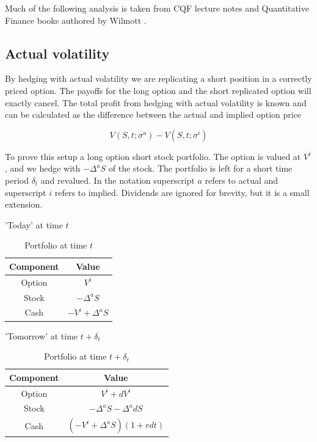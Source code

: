 \documentclass{article}
\newcommand{\para}{\vspace{8pt}} %
\begin{document}
\para
Much of the following analysis is taken from CQF lecture notes and Quantitative Finance books authored by Wilmott \cite{wilmott}.

\subsection{Actual volatility}

By hedging with actual volatility we are replicating a short position in a correctly priced option. The payoffs for the long option and the short replicated option will
exactly cancel.  The total profit from hedging with actual volatility is known and can be calculated as the difference between the actual and implied option price

\[
V(S, t; \sigma^a) - V(S, t; \sigma^i)
\]

To prove this setup a long option short stock portfolio. The option is valued at $V^i$, and we hedge with $-\Delta^a S$ of the stock.
The portfolio is left for a short time period $\delta_t$ and revalued.  In the notation superscript $a$ refers to actual
and superscript $i$ refers to implied.  Dividends are ignored for brevity, but it is a small extension.

\para
'Today' at time $t$

\begin{table}[H]
    \centering
    \begin{tabular}{|c|c|}
        \hline
        \textbf{Component} & \textbf{Value} \\
        \hline
        Option & $V^{i}$ \\
        \hline
        Stock & $-\Delta^{a}S$ \\
        \hline
        Cash & $-V^{i} + \Delta^{a}S$ \\
        \hline
    \end{tabular}
    \caption{Portfolio at time $t$}
    \label{tab:portfolio_t}
\end{table}

\para
'Tomorrow' at time $t + \delta_t$
\begin{table}[H]
    \centering
    \begin{tabular}{|c|c|}
        \hline
        \textbf{Component} & \textbf{Value} \\
        \hline
        Option & $V^{i} + dV^i$\\
        \hline
        Stock & $-\Delta^{a}S -\Delta^{a}dS$ \\
        \hline
        Cash & $(-V^{i} + \Delta^{a}S)(1 + r dt)$ \\
        \hline
    \end{tabular}
    \caption{Portfolio at time $t + \delta_{t}$}
    \label{tab:portfolio_t_plus_delta_t}
\end{table}
\end{document}
